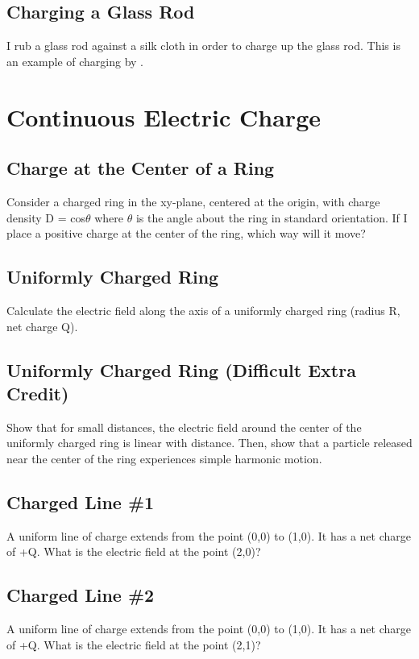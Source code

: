 \documentclass[11pt]{article}
\begin{document}
\subsection{Charging a Glass Rod}
I rub a glass rod against a silk cloth in order to charge up the glass rod.  This is an example of charging by \underline{\hspace{1cm}}.



\pagebreak
\section{Continuous Electric Charge}

\subsection{Charge at the Center of a Ring}
Consider a charged ring in the xy-plane, centered at the origin, with charge density D = cos$\theta$ where $\theta$ is the angle about the ring in standard orientation.  If I place a positive charge at the center of the ring, which way will it move?

\subsection{Uniformly Charged Ring}
Calculate the electric field along the axis of a uniformly charged ring (radius R, net charge Q).

\subsection{Uniformly Charged Ring (Difficult Extra Credit)}
Show that for small distances, the electric field around the center of the uniformly charged ring is linear with distance.  Then, show that a particle released near the center of the ring experiences simple harmonic motion.

\subsection{Charged Line \#1}
A uniform line of charge extends from the point (0,0) to (1,0).  It has a net charge of +Q.  What is the electric field at the point (2,0)?

\subsection{Charged Line \#2}
A uniform line of charge extends from the point (0,0) to (1,0).  It has a net charge of +Q.  What is the electric field at the point (2,1)?
\end{document}
